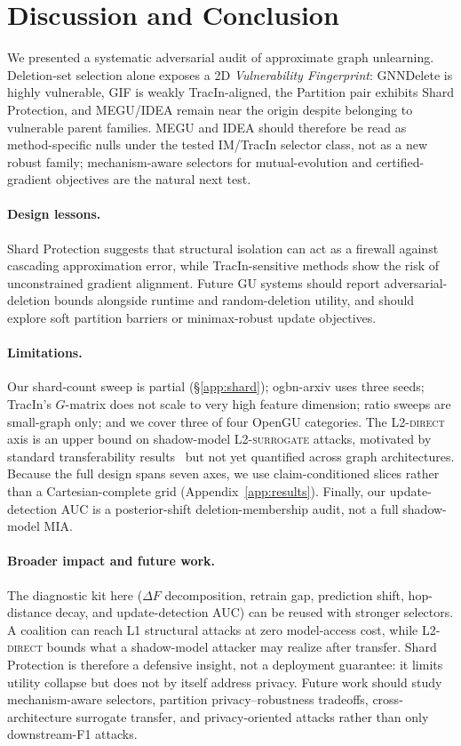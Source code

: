 \section{Discussion and Conclusion}
\label{sec:conclusion}

We presented a systematic adversarial audit of approximate graph
unlearning. Deletion-set selection alone exposes a 2D
\emph{Vulnerability Fingerprint}: GNNDelete is highly vulnerable, GIF is
weakly TracIn-aligned, the Partition pair exhibits Shard Protection, and
MEGU/IDEA remain near the origin despite belonging to vulnerable parent
families. MEGU and IDEA should therefore be read as method-specific nulls
under the tested IM/TracIn selector class, not as a new robust family;
mechanism-aware selectors for mutual-evolution and certified-gradient
objectives are the natural next test.

\paragraph{Design lessons.}
Shard Protection suggests that structural isolation can act as a
firewall against cascading approximation error, while TracIn-sensitive
methods show the risk of unconstrained gradient alignment. Future GU
systems should report adversarial-deletion bounds alongside runtime and
random-deletion utility, and should explore soft partition barriers or
minimax-robust update objectives.

\paragraph{Limitations.}
\label{sec:limitations}
Our shard-count sweep is partial (\S\ref{app:shard}); ogbn-arxiv uses
three seeds; TracIn's $G$-matrix does not scale to very high feature
dimension; ratio sweeps are small-graph only; and we cover three of four
OpenGU categories. The L2-\textsc{direct} axis is an upper bound on
shadow-model L2-\textsc{surrogate} attacks, motivated by standard
transferability results~\cite{papernot2017practical,demontis2019adversarial}
but not yet quantified across graph architectures. Because the full
design spans seven axes, we use claim-conditioned slices rather than a
Cartesian-complete grid (Appendix~\ref{app:results}). Finally, our
update-detection AUC is a posterior-shift deletion-membership audit, not
a full shadow-model MIA.

\paragraph{Broader impact and future work.}
\label{sec:broader}
\label{sec:future}
The diagnostic kit here ($\Delta F$ decomposition, retrain gap,
prediction shift, hop-distance decay, and update-detection AUC) can be
reused with stronger selectors. A coalition can reach L1 structural
attacks at zero model-access cost, while L2-\textsc{direct} bounds what a
shadow-model attacker may realize after transfer. Shard Protection is
therefore a defensive insight, not a deployment guarantee: it limits
utility collapse but does not by itself address privacy. Future work
should study mechanism-aware selectors, partition privacy--robustness
tradeoffs, cross-architecture surrogate transfer, and privacy-oriented
attacks rather than only downstream-F1 attacks.
